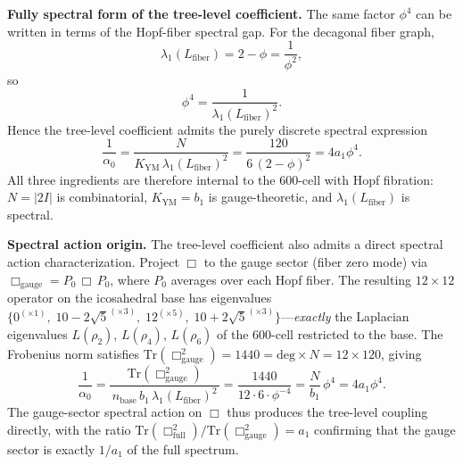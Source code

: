 \documentclass[12pt,a4paper]{article}
\theoremstyle{definition}
\begin{document}
\textbf{Fully spectral form of the tree-level coefficient.}  The same factor $\phi^4$ can be written in terms of the Hopf-fiber spectral gap.  For the decagonal fiber graph,
\begin{equation}
\lambda_1(L_{\mathrm{fiber}}) = 2 - \phi = \frac{1}{\phi^2},
\end{equation}
so
\begin{equation}
\phi^4 = \frac{1}{\lambda_1(L_{\mathrm{fiber}})^2}.
\end{equation}
Hence the tree-level coefficient admits the purely discrete spectral expression
\begin{equation}
\frac{1}{\alpha_0}
= \frac{N}{K_{\mathrm{YM}}\,\lambda_1(L_{\mathrm{fiber}})^2}
= \frac{120}{6\,(2-\phi)^2}
= 4a_1\phi^4.
\label{eq:alpha0_spectral}
\end{equation}
All three ingredients are therefore internal to the 600-cell with Hopf fibration: $N=|2I|$ is combinatorial, $K_{\mathrm{YM}} = b_1$ is gauge-theoretic, and $\lambda_1(L_{\mathrm{fiber}})$ is spectral.

\textbf{Spectral action origin.}  The tree-level coefficient also admits a direct spectral action characterization.  Project $\Box$ to the gauge sector (fiber zero mode) via $\Box_{\mathrm{gauge}} = P_0\,\Box\,P_0$, where $P_0$ averages over each Hopf fiber.  The resulting $12\times12$ operator on the icosahedral base has eigenvalues $\{0^{(\times1)},\; 10-2\sqrt{5}^{(\times3)},\; 12^{(\times5)},\; 10+2\sqrt{5}^{(\times3)}\}$---\emph{exactly} the Laplacian eigenvalues $L(\rho_2)$, $L(\rho_4)$, $L(\rho_6)$ of the 600-cell restricted to the base.  The Frobenius norm satisfies $\mathrm{Tr}(\Box_{\mathrm{gauge}}^2) = 1440 = \mathrm{deg}\times N = 12\times 120$, giving
\begin{equation}
\frac{1}{\alpha_0} = \frac{\mathrm{Tr}(\Box_{\mathrm{gauge}}^2)}{\,n_{\mathrm{base}}\,b_1\,\lambda_1(L_{\mathrm{fiber}})^2\,}
= \frac{1440}{12\cdot 6\cdot\phi^{-4}} = \frac{N}{b_1}\,\phi^4 = 4a_1\phi^4.
\label{eq:alpha0_box}
\end{equation}
The gauge-sector spectral action on $\Box$ thus produces the tree-level coupling directly, with the ratio $\mathrm{Tr}(\Box^2_{\mathrm{full}})/\mathrm{Tr}(\Box^2_{\mathrm{gauge}}) = a_1$ confirming that the gauge sector is exactly $1/a_1$ of the full spectrum.
\end{document}

